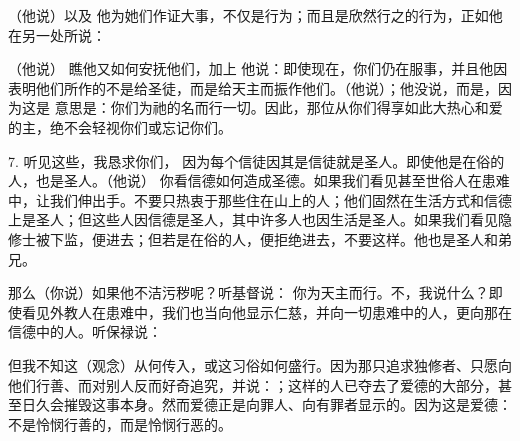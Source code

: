 （他说）以及 他为她们作证大事，不仅是行为；而且是欣然行之的行为，正如他在另一处所说：\par

（他说） 瞧他又如何安抚他们，加上 他说：即使现在，你们仍在服事，并且他因表明他们所作的不是给圣徒，而是给天主而振作他们。（他说）；他没说，而是，因为这是 意思是：你们为祂的名而行一切。因此，那位从你们得享如此大热心和爱的主，绝不会轻视你们或忘记你们。\par

7. 听见这些，我恳求你们， 因为每个信徒因其是信徒就是圣人。即使他是在俗的人，也是圣人。（他说） 你看信德如何造成圣德。如果我们看见甚至世俗人在患难中，让我们伸出手。不要只热衷于那些住在山上的人；他们固然在生活方式和信德上是圣人；但这些人因信德是圣人，其中许多人也因生活是圣人。如果我们看见隐修士被下监，便进去；但若是在俗的人，便拒绝进去，不要这样。他也是圣人和弟兄。\par

那么（你说）如果他不洁污秽呢？听基督说： 你为天主而行。不，我说什么？即使看见外教人在患难中，我们也当向他显示仁慈，并向一切患难中的人，更向那在信德中的人。听保禄说：\par

但我不知这（观念）从何传入，或这习俗如何盛行。因为那只追求独修者、只愿向他们行善、而对别人反而好奇追究，并说：；这样的人已夺去了爱德的大部分，甚至日久会摧毁这事本身。然而爱德正是向罪人、向有罪者显示的。因为这是爱德：不是怜悯行善的，而是怜悯行恶的。\par

